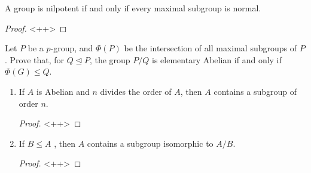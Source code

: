 \documentclass[12pt]{article}
\theoremstyle{definition}
\newenvironment{problem}[2][Problem]{\begin{trivlist}
\item[\hskip \labelsep {\bfseries #1}\hskip \labelsep {\bfseries #2.}]}{\end{trivlist}}
\begin{document}
\begin{problem}{18}
	A group is nilpotent if and only if every maximal subgroup is normal.
	\begin{proof}
		<++>
	\end{proof}
\end{problem}
\begin{problem}{19}
	Let $P$ be a $p$-group, and $\Phi(P)$ be the intersection of all maximal subgroups of $P$. Prove that, for $Q \trianglelefteq P$, the group $P/Q$ is elementary Abelian if and only if $\Phi(G) \leq Q$.
\end{problem}
\begin{problem}{20}
	\begin{enumerate}[label=(\alph*)]
		\item If $A$ is Abelian and $n$ divides the order of $A$, then $A$ contains a subgroup of order $n$.
			\begin{proof}
		<++>		
			\end{proof}
		\item If $B \leq A$ , then $A$ contains a subgroup isomorphic to $A/B$.
			\begin{proof}
				<++>
			\end{proof}
	\end{enumerate}
\end{problem}
\end{document}
